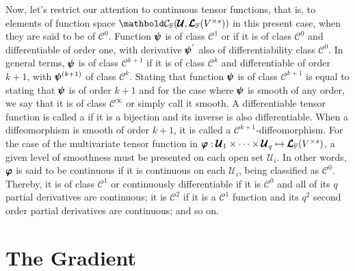 Now, let's restrict our attention to continuous tensor functions, that is, to elements of function space $\evc{\cam{F}}{\pmb{\mathcal{U}}}{\ete{\cam{F}}{V^{\times s}}}$ in this present case, when they are said to be of  $\mathcal{C}^0$. Function $\pmb{\psi}$ is of class $\mathcal{C}^1$ or  if it is of class $\mathcal{C}^0$ and differentiable of order one, with derivative $\pmb{\psi}^{'}$ also of differentiability class $\mathcal{C}^0$. In general terms, $\pmb{\psi}$ is of class $\mathcal{C}^{k+1}$ if it is of class $\mathcal{C}^{k}$ and differentiable of order $k+1$, with $\pmb{\psi}^{(k+1)}$ of class $\mathcal{C}^k$. Stating that function $\pmb{\psi}$ is of class $\mathcal{C}^{k+1}$ is equal to stating that $\pmb{\psi}$ is  of order $k+1$ and for the case where $\pmb{\psi}$ is smooth of any order, we say that it is of class $\mathcal{C}^\infty$ or simply call it smooth. A differentiable tensor function is called a  if it is a bijection and its inverse is also differentiable. When a diffeomorphism is smooth of order $k+1$, it is called a $\mathcal{C}^{k+1}$-diffeomorphism. For the case of the multivariate tensor function in $\pmb{\varphi} : \pmb{\mathcal{U}}_1\times\cdots\times\pmb{\mathcal{U}}_q \mapsto \pmb{\mathcal{L}}_{\mathbb{F}}(V^{\times s})$, a given level of smoothness must be presented on each open set $\pmb{\mathcal{U}}_i$. In other words, $\pmb{\varphi}$ is said to be continuous if it is continuous on each $\pmb{\mathcal{U}}_i$, being classified as $\mathcal{C}^0$. Thereby, it is of class $\mathcal{C}^1$ or continuously differentiable if it is $\mathcal{C}^0$ and all of its $q$ partial derivatives are continuous; it is $\mathcal{C}^2$ if it is a $\mathcal{C}^1$ function and its $q^2$ second order partial derivatives are continuous; and so on.    





\section{The Gradient}

